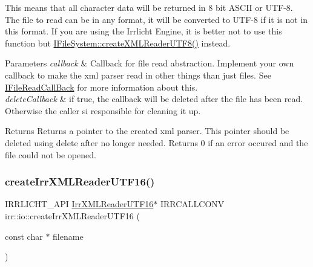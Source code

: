 This means that all character data will be returned in 8 bit A\+S\+C\+II or U\+T\+F-\/8. The file to read can be in any format, it will be converted to U\+T\+F-\/8 if it is not in this format. If you are using the Irrlicht Engine, it is better not to use this function but \hyperlink{classirr_1_1io_1_1IFileSystem_affd8f622ac7c3dcd507f20f9cd23b21f}{I\+File\+System\+::create\+X\+M\+L\+Reader\+U\+T\+F8()} instead. 
\begin{DoxyParams}{Parameters}
{\em callback} & Callback for file read abstraction. Implement your own callback to make the xml parser read in other things than just files. See \hyperlink{classirr_1_1io_1_1IFileReadCallBack}{I\+File\+Read\+Call\+Back} for more information about this. \\
\hline
{\em delete\+Callback} & if true, the callback will be deleted after the file has been read. Otherwise the caller si responsible for cleaning it up. \\
\hline
\end{DoxyParams}
\begin{DoxyReturn}{Returns}
Returns a pointer to the created xml parser. This pointer should be deleted using \textquotesingle{}delete\textquotesingle{} after no longer needed. Returns 0 if an error occured and the file could not be opened. 
\end{DoxyReturn}
\mbox{\label{namespaceirr_1_1io_a86473ef152c15b685af181a4c5461a5d}} 
\subsubsection{\texorpdfstring{create\+Irr\+X\+M\+L\+Reader\+U\+T\+F16()}{createIrrXMLReaderUTF16()}\hspace{0.1cm}{\footnotesize\ttfamily [1/3]}}
{\footnotesize\ttfamily I\+R\+R\+L\+I\+C\+H\+T\+\_\+\+A\+PI \hyperlink{namespaceirr_1_1io_a5eb4094dfd0d509e0cd8a9d1dd30a5b9}{Irr\+X\+M\+L\+Reader\+U\+T\+F16}$\ast$ I\+R\+R\+C\+A\+L\+L\+C\+O\+NV irr\+::io\+::create\+Irr\+X\+M\+L\+Reader\+U\+T\+F16 (\begin{DoxyParamCaption}\item[{const char $\ast$}]{filename }\end{DoxyParamCaption})}




